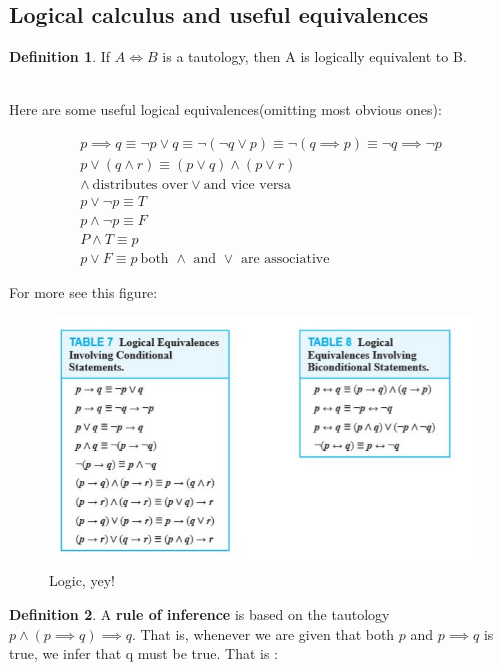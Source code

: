 \documentclass[titlepage]{article}
\theoremstyle{definition}
\newtheorem{definition}{Definition}
\numberwithin{equation}{subsection}
\numberwithin{remark}{subsection}
\begin{document}
\subsection{Logical calculus and useful equivalences}

\begin{definition}
If $A \iff B$ is a tautology, then A is logically equivalent to B. 
\end{definition}
\\

Here are some useful logical equivalences(omitting most obvious ones):

\begin{align*}
    p \implies q \equiv \neg p \lor q \equiv \neg(\neg q \lor p) \equiv \neg(q \implies p) \equiv \neg q \implies \neg p \\
    p \lor ( q \land r) \equiv (p \lor q) \land (p \lor r) \\
    \land \ \text{distributes over} \lor \text{and vice versa}\\
    p \lor \neg p \equiv T\\
    p \land \neg p \equiv F\\
    P \land T \equiv p\\
    p \lor F \equiv p
    \ \text{both $\land$ and $\lor$ are associative}
\end{align*}

For more see this figure:

\begin{figure}[h]
    \centering
    \includegraphics[scale = 0.7]{epflLectureNotes/advancedComputation/figures/logic.JPG}
    \caption{Logic, yey!}
    \label{fig:my_label}
\end{figure}

\begin{definition}
A \textbf{rule of inference} is based on the tautology $p \land (p \implies q) \implies q$. That is, whenever we are given that both $p$ and $p \implies q$ is true, we infer that q must be true. That is :
\\

\end{definition}
\end{document}
